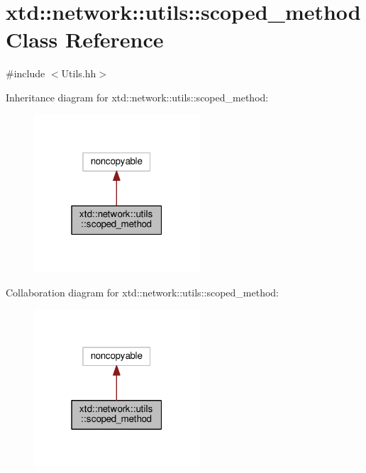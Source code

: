 \hypertarget{classxtd_1_1network_1_1utils_1_1scoped__method}{}\section{xtd\+:\+:network\+:\+:utils\+:\+:scoped\+\_\+method Class Reference}
\label{classxtd_1_1network_1_1utils_1_1scoped__method}


{\ttfamily \#include $<$Utils.\+hh$>$}



Inheritance diagram for xtd\+:\+:network\+:\+:utils\+:\+:scoped\+\_\+method\+:
\nopagebreak
\begin{figure}[H]
\begin{center}
\leavevmode
\includegraphics[width=175pt]{classxtd_1_1network_1_1utils_1_1scoped__method__inherit__graph}
\end{center}
\end{figure}


Collaboration diagram for xtd\+:\+:network\+:\+:utils\+:\+:scoped\+\_\+method\+:
\nopagebreak
\begin{figure}[H]
\begin{center}
\leavevmode
\includegraphics[width=175pt]{classxtd_1_1network_1_1utils_1_1scoped__method__coll__graph}
\end{center}
\end{figure}
